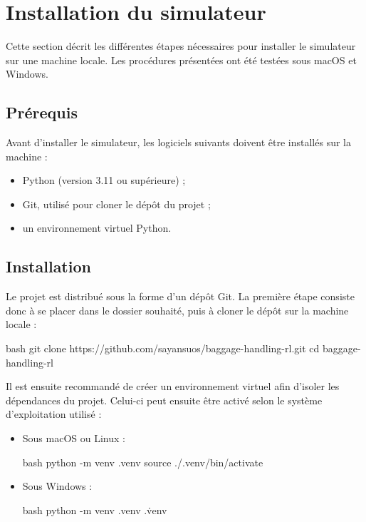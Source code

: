 \section{Installation du simulateur}

\noindent Cette section décrit les différentes étapes nécessaires pour installer le simulateur sur une machine locale. Les procédures présentées ont été testées sous macOS et Windows.

\subsection{Prérequis}

\noindent Avant d'installer le simulateur, les logiciels suivants doivent être installés sur la machine :

\begin{itemize}
    \item Python (version 3.11 ou supérieure) ;
    \item Git, utilisé pour cloner le dépôt du projet ;
    \item un environnement virtuel Python.
\end{itemize}

\subsection{Installation}

\noindent Le projet est distribué sous la forme d'un dépôt Git. La première étape consiste donc à se placer dans le dossier souhaité, puis à cloner le dépôt sur la machine locale :

\begin{codebox}{bash}
    git clone https://github.com/sayansuos/baggage-handling-rl.git
    cd baggage-handling-rl
\end{codebox}
\vspace{10pt}


\noindent Il est ensuite recommandé de créer un environnement virtuel afin d'isoler les dépendances du projet. Celui-ci peut ensuite être activé selon le système d'exploitation utilisé :

\vspace{10pt}


\begin{itemize}
    \item Sous macOS ou Linux :
          \begin{codebox}{bash}
              python -m venv .venv
              source ./.venv/bin/activate
          \end{codebox}
    \item Sous Windows :
          \begin{codebox}{bash}
              python -m venv .venv
              .\.venv\Scripts\activate
          \end{codebox}
\end{itemize}


